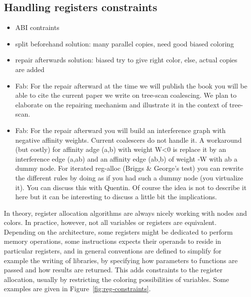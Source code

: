 {\subsection{Handling registers constraints}
{\sl
\begin{itemize}
  \item ABI contraints
  \item split beforehand solution: many parallel copies, need good biased 
    coloring
  \item repair afterwards solution: biased try to give right color, else, 
    actual copies are added
  \item Fab: For the repair afterward at the time we will publish the book you 
    will be able to cite the current paper we write on tree-scan coalescing. We 
    plan to elaborate on the repairing mechanism and illustrate it in the 
    context of tree-scan.
  \item Fab: For the repair afterward you will build an interference graph with 
    negative affinity weights. Current coalescers do not handle it. A 
    workaround (but costly) for affinity adge (a,b) with weight W<0 is replace 
    it by an interference edge (a,ab) and an affinity edge (ab,b) of weight -W 
    with ab a dummy node. For iterated reg-alloc (Briggs \& George's test) you 
    can rewrite the different rules by doing as if you had such a dummy node 
    (you virtualize it). You can discuss this with Quentin. Of course the idea 
    is not to describe it here but it can be interesting to discuss a little 
    bit the implications.
\end{itemize}
}

In theory, register allocation algorithms are always nicely working with nodes 
and colors. In practice, however, not all variables or registers are 
equivalent. Depending on the architecture, some registers might be dedicated 
to perform memory operations, some instructions expects their operands to 
reside in particular registers, and in general conventions are defined to 
simplify for example the writing of libraries, by specifying how parameters to 
functions are passed and how results are returned. This adds constraints to the 
register allocation, usually by restricting the coloring possibilities of 
variables. Some examples are given in Figure~\ref{fig:reg-constraints}.

}
